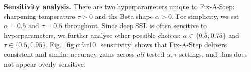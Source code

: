 \textbf{Sensitivity analysis.} 
There are two hyperparameters unique to Fix-A-Step:
sharpening temperature $\tau{>}0$ and the Beta shape $\alpha {>}0$.
For simplicity, we set $\alpha{=}0.5$ and $\tau{=}0.5$ throughout. %
Since deep SSL is often sensitive to hyperparameters, we further analyse other possible choices: $\alpha {\in} \{0.5, 0.75\}$ and $\tau {\in} \{0.5, 0.95\}$.
Fig.~\ref{fig:cifar10_sensitivity} shows that Fix-A-Step delivers consistent and similar accuracy gains across \emph{all} tested $\alpha,\tau$ settings, and thus does not appear overly sensitive.











